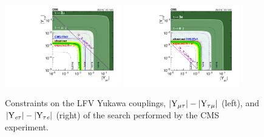 \begin{figure}[htbp]
  \centering
  \includegraphics[width=0.45\textwidth]{plots/chapter2/Ymt.pdf}
  \includegraphics[width=0.45\textwidth]{plots/chapter2/Yet.pdf}
  \caption{Constraints on the LFV Yukawa couplings, $|\text{Y}_{\mu\tau}|-|\text{Y}_{\tau\mu}|$ (left), and $|\text{Y}_{\textit{e}\tau}|-|\text{Y}_{\tau\textit{e}}|$ (right) of the search performed by the CMS experiment.}
  \label{fig:yukawa}
\end{figure}
